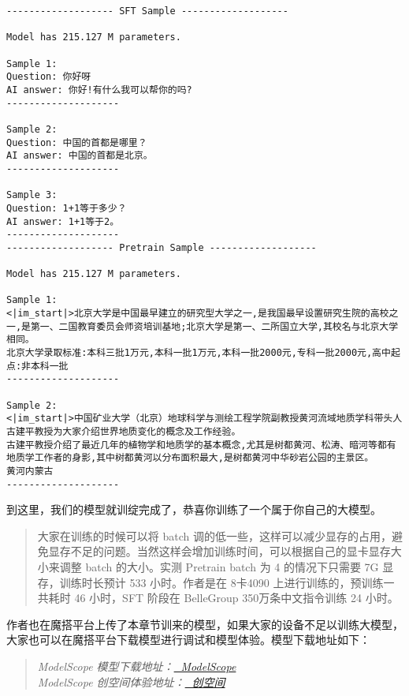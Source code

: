 \documentclass[
]{article}
\begin{document}
\begin{verbatim}
------------------- SFT Sample ------------------- 

Model has 215.127 M parameters.

Sample 1:
Question: 你好呀 
AI answer: 你好!有什么我可以帮你的吗?
--------------------

Sample 2:
Question: 中国的首都是哪里？ 
AI answer: 中国的首都是北京。
--------------------

Sample 3:
Question: 1+1等于多少？ 
AI answer: 1+1等于2。
--------------------
------------------- Pretrain Sample ------------------- 

Model has 215.127 M parameters.

Sample 1:
<|im_start|>北京大学是中国最早建立的研究型大学之一,是我国最早设置研究生院的高校之一,是第一、二国教育委员会师资培训基地;北京大学是第一、二所国立大学,其校名与北京大学相同。
北京大学录取标准:本科三批1万元,本科一批1万元,本科一批2000元,专科一批2000元,高中起点:非本科一批
--------------------

Sample 2:
<|im_start|>中国矿业大学（北京）地球科学与测绘工程学院副教授黄河流域地质学科带头人古建平教授为大家介绍世界地质变化的概念及工作经验。
古建平教授介绍了最近几年的植物学和地质学的基本概念,尤其是树都黄河、松涛、暗河等都有地质学工作者的身影,其中树都黄河以分布面积最大,是树都黄河中华砂岩公园的主景区。
黄河内蒙古
--------------------
\end{verbatim}

到这里，我们的模型就训绽完成了，恭喜你训练了一个属于你自己的大模型。

\begin{quote}
大家在训练的时候可以将 batch
调的低一些，这样可以减少显存的占用，避免显存不足的问题。当然这样会增加训练时间，可以根据自己的显卡显存大小来调整
batch 的大小。实测 Pretrain batch 为 4 的情况下只需要 7G
显存，训练时长预计 533 小时。作者是在 8卡4090
上进行训练的，预训练一共耗时 46 小时，SFT 阶段在 BelleGroup
350万条中文指令训练 24 小时。
\end{quote}

作者也在魔搭平台上传了本章节训来的模型，如果大家的设备不足以训练大模型，大家也可以在魔搭平台下载模型进行调试和模型体验。模型下载地址如下：

\begin{quote}
\emph{ModelScope
模型下载地址：\href{https://www.modelscope.cn/collections/Happy-LLM-e98b91b10b684a}{🤖
ModelScope}}\\
\emph{ModelScope
创空间体验地址：\href{https://www.modelscope.cn/studios/kmno4zx/happy_llm_215M_sft}{🤖
创空间}}
\end{quote}
\end{document}
